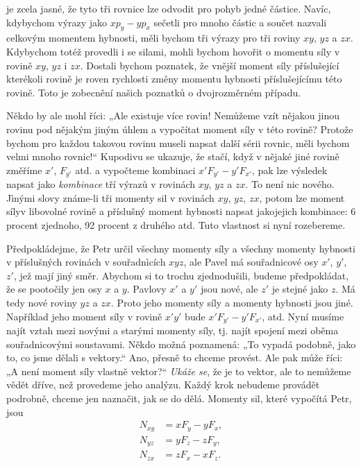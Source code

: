     je zcela jasné, že tyto tři rovnice lze odvodit pro pohyb jedné částice. Navíc, kdybychom výrazy
    jako \(xp_y - yp_x\) sečetli pro mnoho částic a součet nazvali celkovým momentem hybnosti, měli
    bychom tři výrazy pro tři roviny \(xy\), \(yz\) a \(zx\). Kdybychom totéž provedli i se silami,
    mohli bychom hovořit o momentu síly v rovině \(xy\), \(yz\) i \(zx\). Dostali bychom poznatek,
    že vnější moment síly příslušející kterékoli rovině je roven rychlosti změny momentu hybnosti
    příslušejícímu této rovině. Toto je zobecnění našich poznatků o dvojrozměrném případu.

    Někdo by ale mohl říci: „Ale existuje více rovin! Nemůžeme vzít nějakou jinou rovinu pod nějakým
    jiným úhlem a vypočítat moment síly v této rovině? Protože bychom pro každou takovou rovinu
    museli napsat další sérii rovnic, měli bychom velmi mnoho rovnic!“ Kupodivu se ukazuje, že
    stačí, když v nějaké jiné rovině změříme \(x'\), \(F_{y'}\) atd. a vypočteme kombinaci
    \(x'F_{y'}-y'F_{x'}\), pak lze výsledek napsat jako \emph{kombinace} tří výrazů v rovinách
    \(xy\), \(yz\) a \(zx\). To není nic nového. Jìnými slovy známe-li tři momenty sil v rovinách
    \(xy\), \(yz\), \(zx\), potom lze moment sílyv libovolné rovině a příslušný moment hybnosti
    napsat jakojejich kombinace: 6 procent zjednoho, 92 procent z druhého atd. Tuto vlastnost si
    nyní rozebereme.

    Předpokládejme, že Petr určil všechny momenty síly a všechny momenty hybnosti v příslušných
    rovinách v souřadnìcích \(xyz\), ale Pavel má souřadnicové osy \(x'\), \(y'\), \(z'\), jež mají
    jiný směr. Abychom si to trochu zjednodušili, budeme předpokládat, že se pootočily jen osy \(x\)
    a \(y\). Pavlovy \(x'\) a \(y'\) jsou nové, ale \(z'\) je stejné jako \(z\). Má tedy nové roviny
    \(yz\) a \(zx\). Proto jeho momenty síly a momenty hybnosti jsou jiné. Například jeho moment
    síly v rovině \(x'y'\) bude \(x'F_{y'}-y'F_{x'}\), atd. Nyní musíme najít vztah mezi novými a
    starými momenty síly, tj. najít spojení mezi oběma souřadnicovými soustavami. Někdo možná
    poznamená: „To vypadá podobně, jako to, co jsme dělali s vektory.“ Ano, přesně to chceme
    provést. Ale pak může říci: „A není moment síly vlastně vektor?“ \emph{Ukáže se}, že je to
    vektor, ale to nemůžeme vědět dříve, než provedeme jeho analýzu. Každý krok nebudeme provádět
    podrobně, chceme jen naznačit, jak se do dělá. Momenty sil, které vypočítá Petr, jsou
    \begin{subequations}\label{fyz:eq710}
      \begin{align}
        N_{xy} &=  xF_y - yF_x, \label{fyz:eq710a}  \\
        N_{yz} &=  yF_z - zF_y, \label{fyz:eq710b}  \\
        N_{zx} &=  zF_x - xF_z. \label{fyz:eq710c}        
      \end{align}
    \end{subequations}

